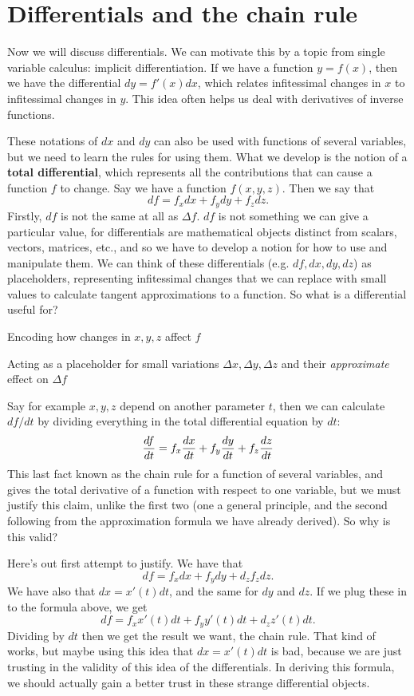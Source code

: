 \section{Differentials and the chain rule}

Now we will discuss differentials. We can motivate this by a topic from single variable calculus: implicit differentiation. If we have a function $y = f(x)$, then we have the differential $dy = f'(x)dx$, which relates infitessimal changes in $x$ to infitessimal changes in $y$. This idea often helps us deal with derivatives of inverse functions. 

These notations of $dx$ and $dy$ can also be used with functions of several variables, but we need to learn the rules for using them. What we develop is the notion of a \textbf{total differential}, which represents all the contributions that can cause a function $f$ to change. Say we have a function $f(x,y,z)$. Then we say that 
\[ df = f_x dx + f_y dy + f_z dz. \]
\bdb
Firstly, $df$ is not the same at all as $\Delta f$. $df$ is not something we can give a particular value, for differentials are mathematical objects distinct from scalars, vectors, matrices, etc., and so we have to develop a notion for how to use and manipulate them. 
\edb
We can think of these differentials (e.g. $df, dx, dy, dz$) as placeholders, representing infitessimal changes that we can replace with small values to calculate tangent approximations to a function. So what is a differential useful for?
\bit
\item Encoding how changes in $x,y,z$ affect $f$
\item Acting as a placeholder for small variations $\Delta x, \Delta y, \Delta z$ and their \textit{approximate} effect on $\Delta f$
\item Say for example $x,y,z$ depend on another parameter $t$, then we can calculate $df/dt$ by dividing everything in the total differential equation by $dt$:
\[ \frac{df}{dt} = f_x \frac{dx}{dt} + f_y \frac{dy}{dt} + f_z \frac{dz}{dt} \]
\eit
This last fact known as the chain rule for a function of several variables, and gives the total derivative of a function with respect to one variable, but we must justify this claim, unlike the first two (one a general principle, and the second following from the approximation formula we have already derived). So why is this valid? 

Here's out first attempt to justify. We have that 
\[ df = f_x dx + f_y dy + d_z f_z dz. \]
We have also that $dx = x'(t)dt$, and the same for $dy$ and $dz$. If we plug these in to the formula above, we get
\[ df = f_x x'(t)dt + f_y y'(t)dt + d_z z'(t)dt . \]
Dividing by $dt$ then we get the result we want, the chain rule. That kind of works, but maybe using this idea that $dx = x'(t)dt$ is bad, because we are just trusting in the validity of this idea of the differentials. In deriving this formula, we should actually gain a better trust in these strange differential objects.

